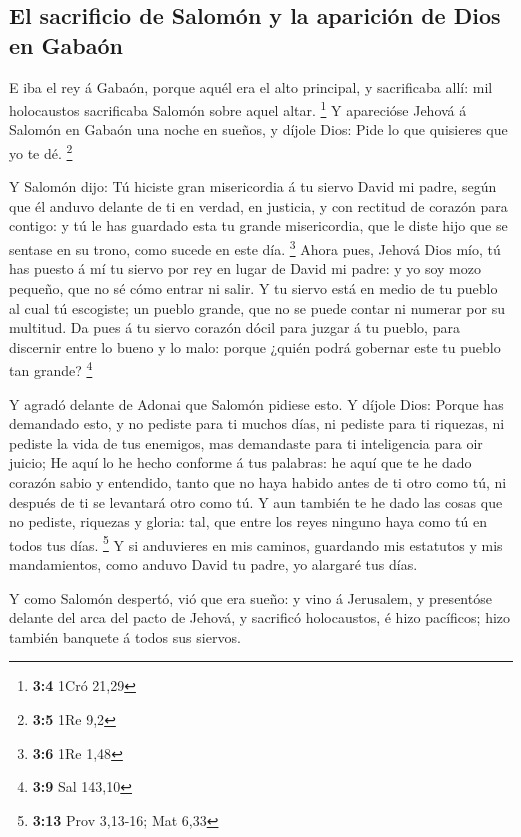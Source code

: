 \hypertarget{el-sacrificio-de-salomuxf3n-y-la-apariciuxf3n-de-dios-en-gabauxf3n}{%
\subsection{El sacrificio de Salomón y la aparición de Dios en
Gabaón}\label{el-sacrificio-de-salomuxf3n-y-la-apariciuxf3n-de-dios-en-gabauxf3n}}

 E iba el rey á Gabaón, porque aquél era el alto
principal, y sacrificaba allí: mil holocaustos sacrificaba Salomón sobre
aquel altar. \footnote{\textbf{3:4} 1Cró 21,29}  Y
aparecióse Jehová á Salomón en Gabaón una noche en sueños, y díjole
Dios: Pide lo que quisieres que yo te dé. \footnote{\textbf{3:5} 1Re 9,2}

 Y Salomón dijo: Tú hiciste gran misericordia á tu siervo
David mi padre, según que él anduvo delante de ti en verdad, en
justicia, y con rectitud de corazón para contigo: y tú le has guardado
esta tu grande misericordia, que le diste hijo que se sentase en su
trono, como sucede en este día. \footnote{\textbf{3:6} 1Re 1,48}
 Ahora pues, Jehová Dios mío, tú has puesto á mí tu siervo
por rey en lugar de David mi padre: y yo soy mozo pequeño, que no sé
cómo entrar ni salir.  Y tu siervo está en medio de tu
pueblo al cual tú escogiste; un pueblo grande, que no se puede contar ni
numerar por su multitud.  Da pues á tu siervo corazón
dócil para juzgar á tu pueblo, para discernir entre lo bueno y lo malo:
porque ¿quién podrá gobernar este tu pueblo tan grande? \footnote{\textbf{3:9}
  Sal 143,10}

 Y agradó delante de Adonai que Salomón pidiese esto.
 Y díjole Dios: Porque has demandado esto, y no pediste
para ti muchos días, ni pediste para ti riquezas, ni pediste la vida de
tus enemigos, mas demandaste para ti inteligencia para oir juicio;
 He aquí lo he hecho conforme á tus palabras: he aquí que
te he dado corazón sabio y entendido, tanto que no haya habido antes de
ti otro como tú, ni después de ti se levantará otro como tú.
 Y aun también te he dado las cosas que no pediste,
riquezas y gloria: tal, que entre los reyes ninguno haya como tú en
todos tus días. \footnote{\textbf{3:13} Prov 3,13-16; Mat 6,33}
 Y si anduvieres en mis caminos, guardando mis estatutos
y mis mandamientos, como anduvo David tu padre, yo alargaré tus días.

 Y como Salomón despertó, vió que era sueño: y vino á
Jerusalem, y presentóse delante del arca del pacto de Jehová, y
sacrificó holocaustos, é hizo pacíficos; hizo también banquete á todos
sus siervos.

